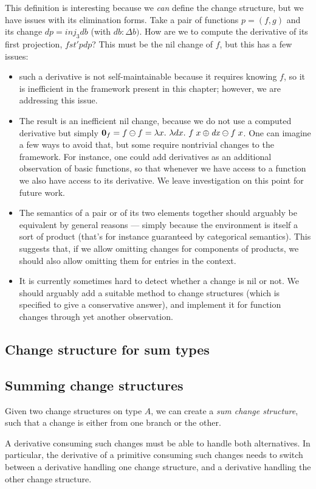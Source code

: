 This definition is interesting because we \emph{can} define the
change structure, but we have issues with its elimination forms.
Take a pair of functions $p = (f, g)$ and its change
$dp = \mathit{inj}_3 db$ (with $db : \Delta b)$. How are we to
compute the derivative of its first projection, $fst' p dp$? This
must be the nil change of $f$, but this has a few issues:
\begin{itemize}
\item such a derivative is not self-maintainable because it
  requires knowing $f$, so it is inefficient in the framework
  present in this chapter; however, we are addressing this issue.
\item The result is an inefficient nil change, because we do not
  use a computed derivative but simply
  $\NilC{f} = \Diff{f}{f} = \Lam{x}{\Lam{dx}{\Diff{\App{f}{\Update
          x {\D{x}}}}{\App{f}{x}}}}$. One can imagine a few ways
  to avoid that, but some require nontrivial changes to the
  framework. For instance, one could add derivatives as an
  additional observation of basic functions, so that whenever we
  have access to a function we also have access to its
  derivative. We leave investigation on this point for future
  work.
\item The semantics of a pair or of its two elements together
  should arguably be equivalent by general reasons --- simply
  because the environment is itself a sort of product (that's for
  instance guaranteed by categorical semantics). This suggests
  that, if we allow omitting changes for components of products,
  we should also allow omitting them for entries in the context.
\item It is currently sometimes hard to detect whether a change
  is nil or not. We should arguably add a suitable method to
  change structures (which is specified to give a conservative
  answer), and implement it for function changes through yet
  another observation.
\end{itemize}

\subsection{Change structure for sum types}

\subsection{Summing change structures}
Given two change structures on type $A$, we can create a
\emph{sum change structure}, such that a change is either from
one branch or the other.

A derivative consuming such changes must be able to handle both
alternatives. In particular, the derivative of a primitive
consuming such changes needs to switch between a derivative
handling one change structure, and a derivative handling the
other change structure.%
